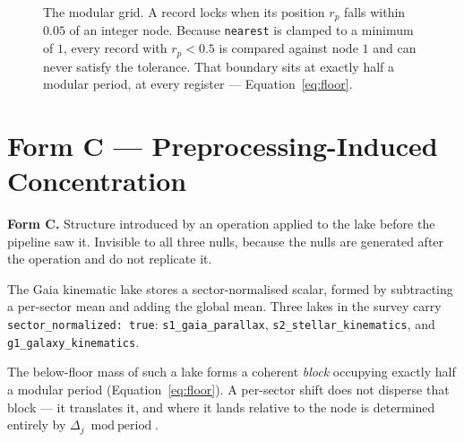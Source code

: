 \documentclass[11pt, letterpaper, openany]{book}
\begin{document}
\begin{figure}[H]
\centering
{}
\caption{The modular grid. A record locks when its position $r_p$ falls within $0.05$ of an
integer node. Because \texttt{nearest} is clamped to a minimum of $1$, every record with
$r_p < 0.5$ is compared against node $1$ and can never satisfy the tolerance. That boundary
sits at exactly half a modular period, at every register --- Equation~\ref{eq:floor}.}
\end{figure}

\section{Form C --- Preprocessing-Induced Concentration}

\begin{formbox}
\textbf{Form C.} Structure introduced by an operation applied to the lake before the pipeline
saw it. Invisible to all three nulls, because the nulls are generated after the operation and
do not replicate it.
\end{formbox}

The Gaia kinematic lake stores a sector-normalised scalar, formed by subtracting a per-sector
mean and adding the global mean. Three lakes in the survey carry
\texttt{sector\_normalized: true}: \texttt{s1\_gaia\_parallax},
\texttt{s2\_stellar\_kinematics}, and \texttt{g1\_galaxy\_kinematics}.

The below-floor mass of such a lake forms a coherent \emph{block} occupying exactly half a
modular period (Equation~\ref{eq:floor}). A per-sector shift does not disperse that block --- it
translates it, and where it lands relative to the node is determined entirely by
$\Delta_j \bmod \text{period}$.
\end{document}
